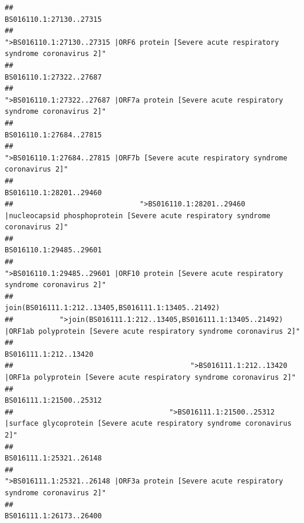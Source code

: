 \documentclass[
]{article}
\begin{document}
\begin{verbatim}
##                                                                                                                BS016110.1:27130..27315 
##                                             ">BS016110.1:27130..27315 |ORF6 protein [Severe acute respiratory syndrome coronavirus 2]" 
##                                                                                                                BS016110.1:27322..27687 
##                                            ">BS016110.1:27322..27687 |ORF7a protein [Severe acute respiratory syndrome coronavirus 2]" 
##                                                                                                                BS016110.1:27684..27815 
##                                                    ">BS016110.1:27684..27815 |ORF7b [Severe acute respiratory syndrome coronavirus 2]" 
##                                                                                                                BS016110.1:28201..29460 
##                              ">BS016110.1:28201..29460 |nucleocapsid phosphoprotein [Severe acute respiratory syndrome coronavirus 2]" 
##                                                                                                                BS016110.1:29485..29601 
##                                            ">BS016110.1:29485..29601 |ORF10 protein [Severe acute respiratory syndrome coronavirus 2]" 
##                                                                                    join(BS016111.1:212..13405,BS016111.1:13405..21492) 
##           ">join(BS016111.1:212..13405,BS016111.1:13405..21492) |ORF1ab polyprotein [Severe acute respiratory syndrome coronavirus 2]" 
##                                                                                                                  BS016111.1:212..13420 
##                                          ">BS016111.1:212..13420 |ORF1a polyprotein [Severe acute respiratory syndrome coronavirus 2]" 
##                                                                                                                BS016111.1:21500..25312 
##                                     ">BS016111.1:21500..25312 |surface glycoprotein [Severe acute respiratory syndrome coronavirus 2]" 
##                                                                                                                BS016111.1:25321..26148 
##                                            ">BS016111.1:25321..26148 |ORF3a protein [Severe acute respiratory syndrome coronavirus 2]" 
##                                                                                                                BS016111.1:26173..26400 

\end{verbatim}
\end{document}
